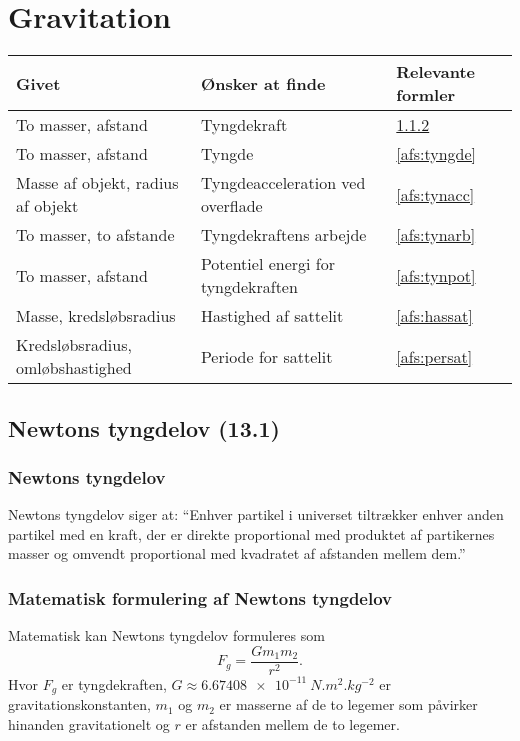 \section{Gravitation}

\begin{table}[ht]
\begin{tabular}{|l|l|l|}
\hline
\textbf{Givet}                   & \textbf{Ønsker at finde}           & \textbf{Relevante formler} \\ \hline
To masser, afstand               & Tyngdekraft                        & \ref{afs:newtyn}           \\ \hline
To masser, afstand               & Tyngde                             & \ref{afs:tyngde}           \\ \hline
Masse af objekt, radius af objekt & Tyngdeacceleration ved overflade & \ref{afs:tynacc} \\ \hline
To masser, to afstande           & Tyngdekraftens arbejde             & \ref{afs:tynarb}           \\ \hline
To masser, afstand               & Potentiel energi for tyngdekraften & \ref{afs:tynpot}           \\ \hline
Masse, kredsløbsradius           & Hastighed af sattelit              & \ref{afs:hassat}           \\ \hline
Kredsløbsradius, omløbshastighed & Periode for sattelit               & \ref{afs:persat}           \\ \hline
\end{tabular}
\end{table}

\subsection{Newtons tyngdelov (13.1)}

\subsubsection{Newtons tyngdelov}
Newtons tyngdelov siger at: ``Enhver partikel i universet tiltrækker enhver anden partikel med en kraft, der er direkte proportional med produktet af partikernes masser og omvendt proportional med kvadratet af afstanden mellem dem.''

\subsubsection{Matematisk formulering af Newtons tyngdelov} \label{afs:newtyn}
Matematisk kan Newtons tyngdelov formuleres som
\[ 
F_g = \frac{Gm_1m_2}{r^2}
.\]
Hvor $F_g$ er tyngdekraften, $G \approx \qty{6,67408e-11}{N.m^2.kg^{-2}} $ er gravitationskonstanten, $m_1$ og $m_2$ er masserne af de to legemer som påvirker hinanden gravitationelt og $r$ er afstanden mellem de to legemer.


